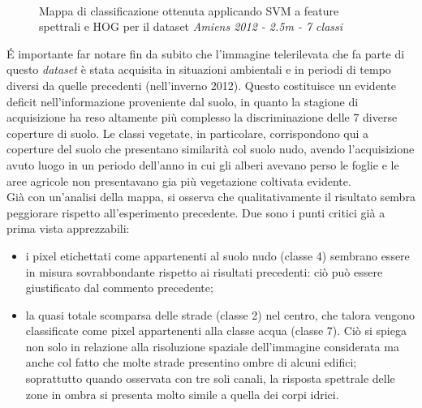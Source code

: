 \begin{figure}[!ht]

\center

\\

\caption{Mappa di classificazione ottenuta applicando SVM a feature spettrali e HOG per il dataset \emph{Amiens 2012 - 2.5m
- 7 classi}}

\label{fig:ClassMap_Amiens2012_2_5m_noroads}

\end{figure}
\clearpage
\'E importante far notare fin da subito che l'immagine telerilevata
che fa parte di questo \emph{dataset} è stata acquisita in situazioni
ambientali e in periodi di tempo diversi da quelle precedenti
(nell'inverno 2012). Questo costituisce un evidente deficit
nell'informazione proveniente dal suolo, in quanto la stagione di
acquisizione ha reso altamente più complesso la discriminazione delle
7 diverse coperture di suolo. Le classi vegetate, in particolare,
corrispondono qui a coperture del suolo che presentano similarità col
suolo nudo, avendo l'acquisizione avuto luogo in un periodo dell'anno
in cui gli alberi avevano perso le foglie e le aree agricole non
presentavano gia più vegetazione coltivata evidente.\\

Già con un'analisi della mappa, si osserva che qualitativamente il
risultato sembra peggiorare rispetto all'esperimento precedente. Due
sono i punti critici già a prima vista apprezzabili:

\begin{itemize}

\item i pixel etichettati come appartenenti al suolo nudo (classe 4)
sembrano essere in misura sovrabbondante rispetto ai risultati precedenti: ciò
può essere giustificato dal commento precedente;

\item la quasi totale scomparsa delle strade (classe 2) nel centro,
che talora vengono classificate come pixel appartenenti alla classe
acqua (classe 7). Ciò si spiega non solo in relazione alla risoluzione
spaziale dell'immagine considerata ma anche col fatto che molte strade
presentino ombre di alcuni edifici; soprattutto quando osservata con
tre soli canali, la risposta spettrale delle zone in ombra si presenta
molto simile a quella dei corpi idrici.

\end{itemize}

